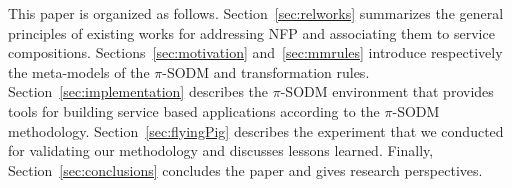 This paper is organized as follows.
Section~\ref{sec:relworks} summarizes the general principles of existing works for addressing NFP and associating them to service compositions.
Sections~\ref{sec:motivation}  and~\ref{sec:mmrules} introduce respectively the meta-models of the $\pi$-SODM and transformation rules. 
Section~\ref{sec:implementation} describes the $\pi$-SODM environment that provides tools for building service based applications according to the $\pi$-SODM methodology. 
Section~\ref{sec:flyingPig} describes the experiment that we conducted for validating our methodology and discusses lessons learned. 
Finally, Section~\ref{sec:conclusions} concludes the paper and gives research perspectives.





